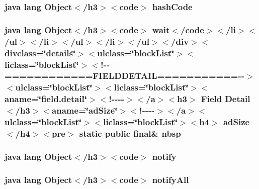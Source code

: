 \hypertarget{_r_8attr_8html_a8e178e2bb2bef055ea23ea3910a221ca}{
\subsubsection[{hash\-Code}]{\setlength{\rightskip}{0pt plus 5cm}java lang Object$<$/h3$>$$<$code$>$ hash\-Code}}\label{_r_8attr_8html_a8e178e2bb2bef055ea23ea3910a221ca}
\hypertarget{_r_8attr_8html_aa951bfd34cce8c54521ae3b7932b3ecf}{
\subsubsection[{nbsp}]{\setlength{\rightskip}{0pt plus 5cm}java lang Object$<$/h3$>$$<$code$>$ {\bf wait}$<$/code$>$$<$/li$>$$<$/ul$>$$<$/li$>$$<$/ul$>$$<$/li$>$$<$/ul$>$$<$/div$>$$<$divclass=\char`\"{}details\char`\"{}$>$$<$ulclass=\char`\"{}block\-List\char`\"{}$>$$<$liclass=\char`\"{}block\-List\char`\"{}$>$$<$!-\/-\/============F\-I\-E\-L\-D\-D\-E\-T\-A\-I\-L===========-\/-\/$>$$<$ulclass=\char`\"{}block\-List\char`\"{}$>$$<$liclass=\char`\"{}block\-List\char`\"{}$>$$<$aname=\char`\"{}field.\-detail\char`\"{}$>$$<$!-\/-\/-\/-\/$>$$<$/a$>$$<$h3$>$ Field {\bf Detail}$<$/h3$>$$<$aname=\char`\"{}ad\-Size\char`\"{}$>$$<$!-\/-\/-\/-\/$>$$<$/a$>$$<$ulclass=\char`\"{}block\-List\char`\"{}$>$$<$liclass=\char`\"{}block\-List\char`\"{}$>$$<$h4$>$ ad\-Size$<$/h4$>$$<$pre$>$ static public final\& nbsp}}\label{_r_8attr_8html_aa951bfd34cce8c54521ae3b7932b3ecf}
\hypertarget{_r_8attr_8html_ae99ae10b5010594dbda4794e02db271b}{
\subsubsection[{notify}]{\setlength{\rightskip}{0pt plus 5cm}java lang Object$<$/h3$>$$<$code$>$ notify}}\label{_r_8attr_8html_ae99ae10b5010594dbda4794e02db271b}
\hypertarget{_r_8attr_8html_a1279357e6e09e33e75b55eb05fdb6436}{
\subsubsection[{notify\-All}]{\setlength{\rightskip}{0pt plus 5cm}java lang Object$<$/h3$>$$<$code$>$ notify\-All}}\label{_r_8attr_8html_a1279357e6e09e33e75b55eb05fdb6436}
